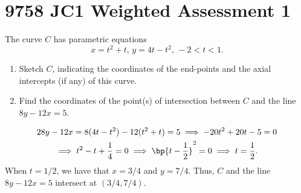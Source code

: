 \section{9758 JC1 Weighted Assessment 1}

\begin{problem}
    The curve $C$ has parametric equations \[x = t^2 + t, \, y = 4t - t^2, \, -2 < t < 1.\]

    \begin{enumerate}
        \item Sketch $C$, indicating the coordinates of the end-points and the axial intercepts (if any) of this curve.
        \item Find the coordinates of the point(s) of intersection between $C$ and the line $8y - 12x = 5$.
    \end{enumerate}
\end{problem}
\begin{solution}
    \begin{ppart}
        \begin{center}
        \end{center}
    \end{ppart}
    \begin{ppart}
        \begin{gather*}{2}
            8y-12x = 8(4t-t^2) - 12(t^2 + t) = 5 \implies -20t^2 + 20t - 5 = 0 \\
            \implies t^2 - t + \frac14 = 0 \implies \bp{t - \frac12}^2 = 0 \implies t = \frac12.
        \end{gather*}
        When $t = 1/2$, we have that $x = 3/4$ and $y = 7/4$. Thus, $C$ and the line $8y-12x=5$ intersect at $(3/4, 7/4)$.
    \end{ppart}
\end{solution}

